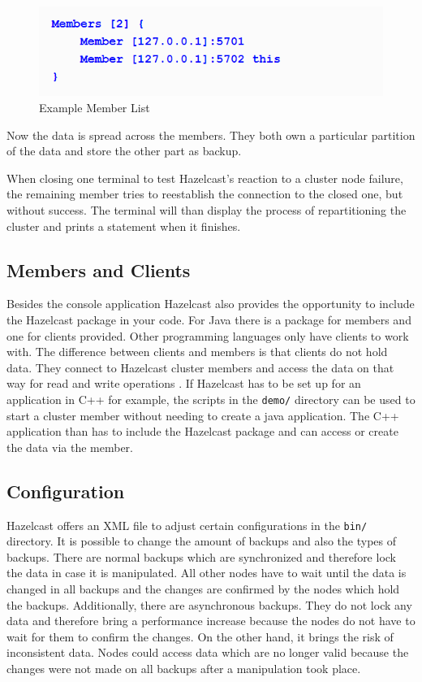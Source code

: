 \begin{flushleft}
\begin{figure}[h]
    \includegraphics{img/hazelcastMembers.PNG}
    \caption{Example Member List \parencite{johns2015}}
\end{figure}
\end{flushleft}
Now the data is spread across the members. They both own a particular partition of the data and store the other part as backup.

When closing one terminal to test Hazelcast's reaction to a cluster node failure, the remaining member tries to reestablish the connection to the closed one, but without success. The terminal will than display the process of repartitioning the cluster and prints a statement when it finishes.
\subsection*{Members and Clients}
Besides the console application Hazelcast also provides the opportunity to include the Hazelcast package in your code. For Java there is a package for members and one for clients provided. Other programming languages only have clients to work with. The difference between clients and members is that clients do not hold data. They connect to Hazelcast cluster members and access the data on that way for read and write operations \parencite{hazelcastmanual}. If Hazelcast has to be set up for an application in C++ for example, the scripts in the \texttt{demo/} directory can be used to start a cluster member without needing to create a java application. The C++ application than has to include the Hazelcast package and can access or create the data via the member.
\subsection*{Configuration}
Hazelcast offers an XML file to adjust certain configurations in the \texttt{bin/} directory.
It is possible to change the amount of backups and also the types of backups. There are normal backups which are synchronized and therefore lock the data in case it is manipulated. All other nodes have to wait until the data is changed in all backups and the changes are confirmed by the nodes which hold the backups. Additionally, there are asynchronous backups. They do not lock any data and therefore bring a performance increase because the nodes do not have to wait for them to confirm the changes. On the other hand, it brings the risk of inconsistent data. Nodes could access data which are no longer valid because the changes were not made on all backups after a manipulation took place.

